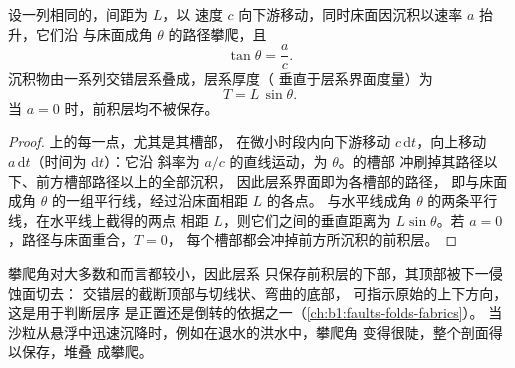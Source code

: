 \begin{proposition}[攀爬床形]\label{prop:b1:clastic-sediments:climb}
设一列相同的，间距为 $L$，以
速度 $c$ 向下游移动，同时床面因沉积以速率 $a$ 抬升，它们沿
与床面成角 $\theta$ 的路径攀爬，且
\[
  \tan\theta = \frac{a}{c}.
\]
沉积物由一系列交错层系叠成，层系厚度（
垂直于层系界面度量）为
\[
  T = L\,\sin\theta .
\]
当 $a = 0$ 时，前积层均不被保存。
\end{proposition}

\begin{proof}
上的每一点，尤其是其槽部，
在微小时段内向下游移动 $c\,\mathrm dt$，向上移动 $a\,\mathrm dt$（时间为 $\mathrm dt$）：它沿
斜率为 $a/c$ 的直线运动，为 $\theta$。的槽部
冲刷掉其路径以下、前方槽部路径以上的全部沉积，
因此层系界面即为各槽部的路径，
即与床面成角 $\theta$ 的一组平行线，经过沿床面相距 $L$ 的各点。
与水平线成角 $\theta$ 的两条平行线，在水平线上截得的两点
相距 $L$，则它们之间的垂直距离为
$L\sin\theta$。若 $a = 0$，路径与床面重合，$T = 0$，
每个槽部都会冲掉前方所沉积的前积层。
\end{proof}

攀爬角对大多数和而言都较小，因此层系
只保存前积层的下部，其顶部被下一侵蚀面切去：
交错层的截断顶部与切线状、弯曲的底部，
可指示原始的上下方向，这是用于判断层序
是正置还是倒转的依据之一（\cref{ch:b1:faults-folds-fabrics}）。
当沙粒从悬浮中迅速沉降时，例如在退水的洪水中，攀爬角
变得很陡，整个剖面得以保存，堆叠
成攀爬。

